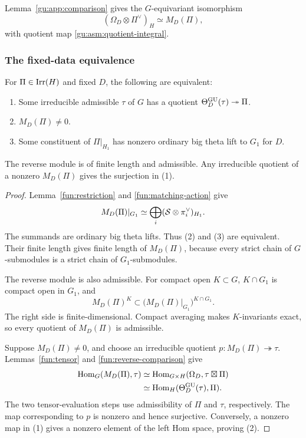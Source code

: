 Lemma~\ref{gu:app:comparison} gives the $G$-equivariant isomorphism
\[
 (\Omega_D\otimes\Pi^\vee)_H\simeq M_D(\Pi),
\]
with quotient map \eqref{gu:asm:quotient-integral}.

\subsubsection{The fixed-data equivalence}

\begin{proposition}\label{fun:fixed-data}\label{gu:asm:assembly}
For \(\Pi\in\operatorname{Irr}(H)\) and fixed \(D\), the following
are equivalent:
\begin{enumerate}
\item Some irreducible admissible \(\tau\) of \(G\) has a quotient
\(\Theta_D^{\operatorname{GU}}(\tau)\twoheadrightarrow\Pi\).
\item \(M_D(\Pi)\ne0\).
\item Some constituent of \(\Pi|_{H_1}\) has nonzero ordinary big
theta lift to \(G_1\) for \(D\).
\end{enumerate}
The reverse module is of finite length and admissible. Any
irreducible quotient of a nonzero \(M_D(\Pi)\) gives the
surjection in (1).
\end{proposition}

\begin{proof}
Lemma~\ref{fun:restriction} and \eqref{fun:matching-action} give
\[
 M_D(\Pi)|_{G_1}
 \simeq\bigoplus_i(\mathcal S\otimes\pi_i^\vee)_{H_1}.
\]
The summands are ordinary big theta lifts. Thus (2) and (3) are
equivalent. Their finite length gives finite length of \(M_D(\Pi)\),
because every strict chain of \(G\)-submodules is a strict chain
of \(G_1\)-submodules.

The reverse module is also admissible. For compact open \(K\subset G\),
\(K\cap G_1\) is compact open in \(G_1\), and
\[
 M_D(\Pi)^K\subset
 \bigl(M_D(\Pi)|_{G_1}\bigr)^{K\cap G_1}.
\]
The right side is finite-dimensional. Compact averaging makes
\(K\)-invariants exact, so every quotient of \(M_D(\Pi)\) is
admissible.

Suppose \(M_D(\Pi)\ne0\), and choose an irreducible quotient
\(p:M_D(\Pi)\twoheadrightarrow\tau\). Lemmas~\ref{fun:tensor}
and \ref{fun:reverse-comparison} give
\[
\begin{aligned}
 \operatorname{Hom}_G(M_D(\Pi),\tau)
 &\simeq\operatorname{Hom}_{G\times H}
       (\Omega_D,\tau\boxtimes\Pi)\\
 &\simeq\operatorname{Hom}_H
       (\Theta_D^{\operatorname{GU}}(\tau),\Pi).
\end{aligned}
\]
The two tensor-evaluation steps use admissibility of \(\Pi\)
and \(\tau\), respectively. The map corresponding to \(p\) is
nonzero and hence surjective. Conversely, a nonzero map in (1)
gives a nonzero element of the left Hom space, proving (2).
\end{proof}

